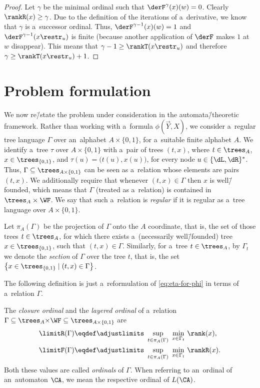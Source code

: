 \begin{proof}
	Let $\gamma$ be the minimal ordinal such that $\derF^\gamma(x)(w)=0$.
	Clearly $\rankR(x)\geq\gamma$.
	Due to the definition of the iterations of a~derivative, we know that $\gamma$ is a~successor ordinal.
	Thus, $\derF^{\gamma-1}(x)(w)=1$ and $\derF^{\gamma-1}(x\restr_u)$ is finite (because another application of $\derF$ makes $1$ at $w$ disappear).
	This means that $\gamma-1\geq \rankT(x\restr_u)$ and therefore $\gamma\geq\rankT(x\restr_u)+1$.
\end{proof}



\section{Problem formulation}
\label{sec:problem}

We now re\=/state the problem under consideration in the automata\=/theoretic framework.
Rather than working with a~formula $\phi(\vec{Y},X)$, we consider a~regular tree language $\Gamma$ over an~alphabet $A\times\{0,1\}$, for a~suitable finite alphabet $A$.
We identify a~tree $\tau$ over $A\times\{0,1\}$ with a~pair of trees $(t,x)$, where $t\in\trees_A$, $x\in\trees_{\{0,1\}}$, and $\tau(u)=\big(t(u),x(u)\big)$, for every node $u\in\{\dL,\dR\}^\ast$.
Thus, $\Gamma\subseteq\trees_{A\times\{0,1\}}$ can be seen as a~relation whose elements are pairs $(t,x)$.
We additionally require that whenever $(t,x)\in\Gamma$ then $x$ is well\=/founded, which means that $\Gamma$ (treated as a~relation) is contained in $\trees_A\times \WF$.
We say that such a~relation is \emph{regular} if it is regular as a~tree language over $A\times\{0,1\}$.

Let $\pi_A(\Gamma)$ be the projection of $\Gamma$ onto the $A$ coordinate, that is,
the set of those trees $t\in\trees_A$, for which there exists a~(necessarily well\=/founded) tree $x\in\trees_{\{0,1\}}$, such that $(t,x)\in \Gamma$.
Similarly, for a~tree $t\in\trees_A$, by $\Gamma_t$ we denote the \emph{section} of $\Gamma$ over the tree $t$, that is, the set $\big\{x\in\trees_{\{0,1\}}\mid (t,x)\in\Gamma\big\}$.

The following definition is just a~reformulation of \cref{eq:eta-for-phi} in terms of a~relation $\Gamma$.

\begin{defi}
	The \emph{closure ordinal} and the \emph{layered ordinal} of a~relation $\Gamma\subseteq \trees_A{\times} \WF\subseteq \trees_{A\times\{0,1\}}$ are
	\begin{align*}
	\limitR(\Gamma) &\eqdef\adjustlimits\sup_{\ t\in\pi_A(\Gamma)\ }\min_{x\in\Gamma_t}\, \rank(x),\\
	\limitF(\Gamma) &\eqdef\adjustlimits\sup_{\ t\in\pi_A(\Gamma)\ }\min_{x\in\Gamma_t}\, \rankR(x).\\
	\end{align*}
	Both these values are called \emph{ordinals} of $\Gamma$.
	When referring to an~ordinal of an~automaton $\CA$, we mean the respective ordinal of $L({\CA})$.
\end{defi}

